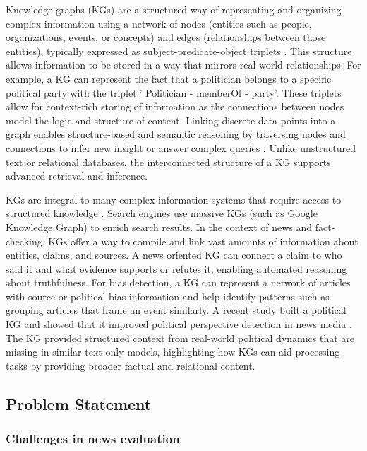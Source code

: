 \documentclass[11pt]{article}
\begin{document}
Knowledge graphs (KGs) are a structured way of representing and organizing complex information using a network of nodes (entities such as people, organizations, events, or concepts) and edges (relationships between those entities), typically expressed as subject-predicate-object triplets \cite{r7}. This structure allows information to be stored in a way that mirrors real-world relationships. For example, a KG can represent the fact that a politician belongs to a specific political party with the triplet:' Politician - memberOf - party'. These triplets allow for context-rich storing of information as the connections between nodes model the logic and structure of content. Linking discrete data points into a graph enables structure-based and semantic reasoning by traversing nodes and connections to infer new insight or answer complex queries \cite{r8}. Unlike unstructured text or relational databases, the interconnected structure of a KG supports advanced retrieval and inference.

KGs are integral to many complex information systems that require access to structured knowledge \cite{r9}. Search engines use massive KGs (such as Google Knowledge Graph) to enrich search results. In the context of news and fact-checking, KGs offer a way to compile and link vast amounts of information about entities, claims, and sources. A news oriented KG can connect a claim to who said it and what evidence supports or refutes it, enabling automated reasoning about truthfulness\cite{r10}.
For bias detection, a KG can represent a network of articles with source or political bias information and help identify patterns such as grouping articles that frame an event similarly. A recent study built a political KG and showed that it improved political perspective detection in news media \cite{r11}. The KG provided structured context from real-world political dynamics that are missing in similar text-only models, highlighting how KGs can aid processing tasks by providing broader factual and relational content.

 





\subsection{Problem Statement}
\subsubsection{Challenges in news evaluation }
\end{document}
